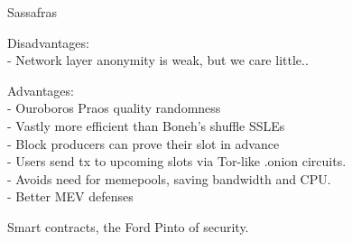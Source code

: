 \documentclass{beamer}
\begin{document}
\begin{frame}{Sassafras}

Disadvantages: \\
- Network layer anonymity is weak, but we care little.. \\

\bigskip\bigskip

Advantages: \\ \smallskip
- Ouroboros Praos quality randomness \\ \smallskip
- Vastly more efficient than Boneh's shuffle SSLEs \\ \smallskip
- Block producers can prove their slot in advance \\ \smallskip
- Users send tx to upcoming slots via Tor-like {.onion} circuits. \\ \smallskip
- Avoids need for memepools, saving bandwidth and CPU. \\ \smallskip
- Better MEV defenses \\ \smallskip

\pause\bigskip\bigskip

\hspace{10pt} Smart contracts, the Ford Pinto of security.

\end{frame}
\end{document}
